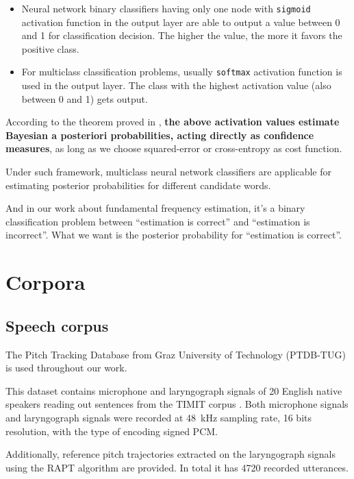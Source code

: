 \documentclass[11pt,a4paper]{report}
\begin{document}
\begin{itemize}
  \item Neural network binary classifiers having only one node with \texttt{sigmoid} activation function in the output layer are able to output a value between 0 and 1 for classification decision.
    The higher the value, the more it favors the positive class.
  \item For multiclass classification problems, usually \texttt{softmax} activation function is used in the output layer.
    The class with the highest activation value (also between 0 and 1) gets output.
\end{itemize}

According to the theorem proved in \parencite{richard1991neural}, \textbf{the above activation values estimate Bayesian a posteriori probabilities, acting directly as confidence measures}, as long as we choose squared-error or cross-entropy as cost function.

\bigskip

Under such framework, multiclass neural network classifiers are applicable for estimating posterior probabilities for different candidate words.

And in our work about fundamental frequency estimation, it's a binary classification problem between \enquote{estimation is correct} and \enquote{estimation is incorrect}.
What we want is the posterior probability for \enquote{estimation is correct}.

\chapter{Corpora}

\section{Speech corpus}

The Pitch Tracking Database from Graz University of Technology (PTDB-TUG) \parencite{pirker2011pitch} is used throughout our work.

This dataset contains microphone and laryngograph signals of 20 English native speakers reading out sentences from the TIMIT corpus \parencite{garofolo1993darpa}.
Both microphone signals and laryngograph signals were recorded at \SI{48}{\kilo\hertz} sampling rate, 16 bits resolution, with the type of encoding signed PCM.

Additionally, reference pitch trajectories extracted on the laryngograph signals using the RAPT algorithm \parencite{talkin1995robust} are provided.
In total it has 4720 recorded utterances.
\end{document}

